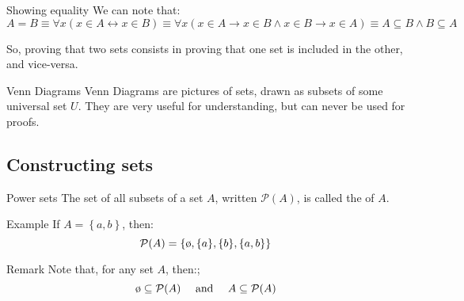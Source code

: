 \documentclass[a4paper]{article}
\begin{document}
\begin{parag}{Showing equality}
    We can note that:
    \[A = B \equiv \forall x\left(x \in A \leftrightarrow x \in B\right) \equiv \forall x\left(x \in A \to x \in B \land x \in B \to x \in A\right) \equiv A \subseteq B \land B \subseteq A\]

    So, proving that two sets consists in proving that one set is included in the other, and vice-versa.
\end{parag}

\begin{parag}{Venn Diagrams}
    Venn Diagrams are pictures of sets, drawn as subsets of some universal set $U$. They are very useful for understanding, but can never be used for proofs.

\end{parag}


\subsection{Constructing sets}

\begin{parag}{Power sets}
    The set of all subsets of a set $A$, written $\mathcal{P}\left(A\right)$, is called the  of $A$.

    \begin{subparag}{Example}
        If $A = \left\{a, b\right\}$, then:
        \[\mathcal{P}\left(A\right) = \left\{\o, \left\{a\right\}, \left\{b\right\}, \left\{a, b\right\}\right\}\]
    \end{subparag}

    \begin{subparag}{Remark}
        Note that, for any set $A$, then:;
        \[\o \subseteq \mathcal{P}\left(A\right) \mathspace \text{ and } \mathspace A \subseteq \mathcal{P}\left(A\right)\]
    \end{subparag}
\end{parag}
\end{document}
